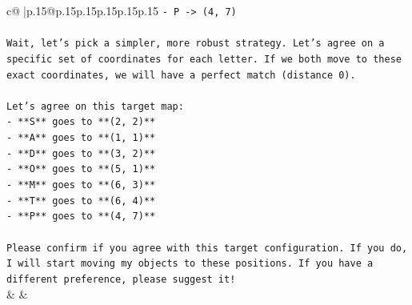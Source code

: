 \documentclass{article}
\begin{document}
{\begin{supertabular}{c@{$\;$}|p{.15\linewidth}@{}p{.15\linewidth}p{.15\linewidth}p{.15\linewidth}p{.15\linewidth}p{.15\linewidth}}
{{{\texttt{{-} P {-}> (4, 7)} \\
\\ 
\texttt{Wait, let's pick a simpler, more robust strategy. Let's agree on a specific set of coordinates for each letter. If we both move to these exact coordinates, we will have a perfect match (distance 0).} \\
\\ 
\texttt{Let's agree on this target map:} \\
\texttt{{-} **S** goes to **(2, 2)**} \\
\texttt{{-} **A** goes to **(1, 1)**} \\
\texttt{{-} **D** goes to **(3, 2)**} \\
\texttt{{-} **O** goes to **(5, 1)**} \\
\texttt{{-} **M** goes to **(6, 3)**} \\
\texttt{{-} **T** goes to **(6, 4)**} \\
\texttt{{-} **P** goes to **(4, 7)**} \\
\\ 
\texttt{Please confirm if you agree with this target configuration. If you do, I will start moving my objects to these positions. If you have a different preference, please suggest it!} \\
            }
        }
    }
    & & \\ \\


\end{supertabular}}
\end{document}
